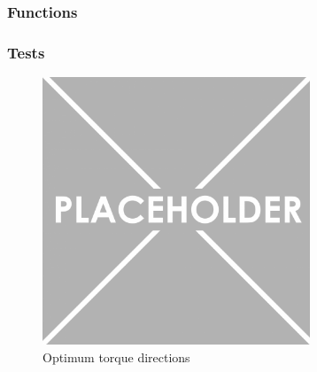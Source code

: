 \documentclass[twoside,twocolumn,12pt]{article}
\begin{document}
\twocolumn
\subsubsection{Functions}



\subsubsection{Tests}



\clearpage
\begin{figure}
  \centering
    \includegraphics[width=\linewidth,height = 8cm]{place}
  \caption{Optimum torque directions}
  \label{fig:quad}
\end{figure} 
\end{document}
